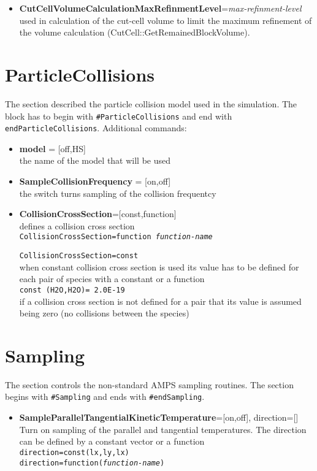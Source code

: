 \begin{itemize}
\item {\bf CutCellVolumeCalculationMaxRefinmentLevel}={\it max-refinment-level} \\ used in calculation of the cut-cell volume to limit the maximum refinement of the volume calculation (CutCell::GetRemainedBlockVolume). 

\end{itemize}




\section{ParticleCollisions}
The section described the particle collision model used in the simulation. The block has to begin with {\tt \#ParticleCollisions} and end with {\tt endParticleCollisions}. Additional commands:
\begin{itemize}
\item {\bf model} = [off,HS] \\ the name of the model that will be used
\item {\bf SampleCollisionFrequency} = [on,off] \\ the switch turns sampling of the collision frequentcy
\item{\bf CollisionCrossSection}=[const,function] \\ defines a collision cross section \\ {\tt CollisionCrossSection=function {\it function-name}} 

{\tt CollisionCrossSection=const} \\ when constant collision cross section is used its value has to be defined for each pair of species with a constant or a function \\ {\tt const (H2O,H2O)= 2.0E-19} \\ if a collision cross section is not defined for a pair that its value is assumed being zero (no collisions between the species)
\end{itemize}


\section{Sampling}
The section controls the non-standard AMPS sampling routines. The section begins with {\tt \#Sampling} and ends with {\tt \#endSampling}.

\begin{itemize}
\item {\bf SampleParallelTangentialKineticTemperature}=[on,off], direction=[] \\
Turn on sampling of the parallel and tangential temperatures. The direction can be defined by a constant vector or a function \\ {\tt direction=const(lx,ly,lx)} \\ {\tt direction=function({\it function-name})}

\end{itemize}



